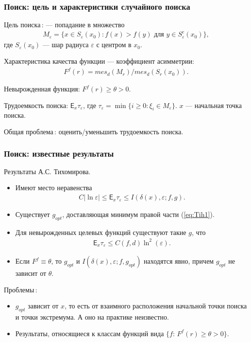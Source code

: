 \documentclass[pdf, intlimits, 14pt, unicode]{beamer} %
\begin{document}
\begin{frame}
    \frametitle{Поиск: цель и характеристики случайного поиска}
    {\alert{Цель поиска\,:}} --- попадание в множество
    \begin{gather*}
        M_\varepsilon=\{x\in S_\varepsilon(x_0):f(x)>f(y)\text{ для
        }y\in S_\varepsilon^c(x_0)\},
    \end{gather*}
    где $S_\varepsilon(x_0)$ --- шар радиуса $\varepsilon$ с центром в
    $x_0$.

    Характеристика качества функции --- коэффициент асимметрии:
    \begin{gather*}
        F^f(r)=mes_d(M_r)/mes_d(S_r(x_0)).
    \end{gather*}

    {\alert{Невырожденная}} функция: $F^f(r)\geq \theta>0$.

    {\alert{Трудоемкость}} поиска: $\mathsf{E}_x\tau_\varepsilon$,
    где $\tau_\varepsilon=\min\{i\geq0:\xi_i\in M_\varepsilon\}$.  $x$
    --- начальная точка поиска.

    {\alert{Общая проблема\,:}} оценить/уменьшить трудоемкость
    поиска.
\end{frame}

\begin{frame}
    \frametitle{Поиск: известные результаты}
    \alert{Результаты А.С. Тихомирова.}
    \begin{itemize}
        \item Имеют место неравенства
        \begin{gather}
            \label{eq:Tih1}
            C|\ln\varepsilon|\leq \mathsf{E}_x\tau_\varepsilon\leq
            I(\delta(x),\varepsilon;f,g).
        \end{gather}
        \item Существует $g_{opt}$, доставляющая минимум правой части
        (\ref{eq:Tih1}).
        \item Для невырожденных целевых функций существуют такие $g$,
        что
        \begin{gather*}
            \mathsf{E}_x\tau_\varepsilon\leq C(f,d)\ln^2(\varepsilon).
        \end{gather*}
        \item Если $F^f\equiv\theta$, то $g_{opt}$ и
        $I(\delta(x),\varepsilon;f,g_{opt})$ находятся явно, причем
        $g_{opt}$ не зависит от $\theta$.
    \end{itemize}

    \alert{Проблемы\,:}
    \begin{itemize}
        \item $g_{opt}$ зависит от $x$, то есть от взаимного
        расположения начальной точки поиска и точки экстремума. А оно
        на практике неизвестно.
        \item Результаты, относящиеся к классам функций вида
        $\{f:\,F^f(r)\geq \theta>0\}$.
    \end{itemize}
\end{frame}
\end{document}
